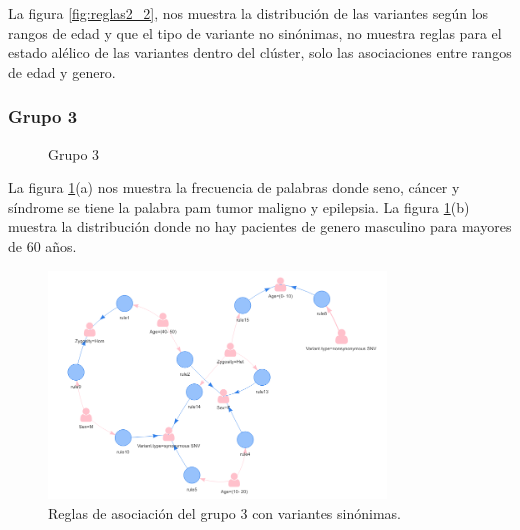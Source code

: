 La figura \ref{fig:reglas2_2}, nos muestra la distribución de las variantes según los rangos de edad y que el tipo de variante no sinónimas, no muestra reglas para el estado alélico de las variantes dentro del clúster, solo las asociaciones entre rangos de edad y genero. 

\subsubsection*{Grupo 3}

\begin{figure}[h]
	\centering
	\caption{Grupo 3} \label{fig:c3}
\end{figure}

La figura \ref{fig:c3}(a) nos muestra la frecuencia de palabras donde seno, cáncer y síndrome se tiene la palabra pam tumor maligno y epilepsia. La figura \ref{fig:c3}(b) muestra la distribución donde no hay pacientes de genero masculino para mayores de 60 años.  

\begin{figure}[H]
	\centering
	\includegraphics[width=0.8\textwidth]{Kap4/reglas3_1}
	\caption{Reglas de asociación del grupo 3 con variantes sinónimas.} \label{fig:r3}
\end{figure}

